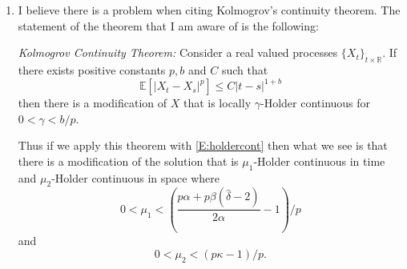 \documentclass[a4paper,11pt]{article}
\numberwithin{equation}{section}
\numberwithin{equation}{section}
\theoremstyle{plain}
\theoremstyle{definition}
\newcommand{\R}{\mathbb{R}}
\begin{document}
\begin{enumerate}
\begin{align*}
		\\& \quad \quad+ 2^{p-1}(4p)^{p/2} \left(\sup_{(s,y)\in[0,T]\times \R} \mathbb{E}\left[|u(s,y)|^p\right]\right)\left( C\left(|t_2-t_1|^{\frac{\alpha + \beta(\hat{\delta} -2)}{\alpha}}  \right)^{p/2} \right)
	\end{align*}
where 
	\[
			0 < \kappa < \frac{\alpha+\beta(\bar{\delta}-2)}{\beta}.
	\]
This does not reduce to statement of the Lemma. However, through repeated use of the inequality $(a+b)^p \le 2^{p-1}(a^p+b^p)$ we can say that 
	\begin{align}
		&2^{p-1}(4p)^{p/2} \left(\sup_{(s,y)\in[0,T]\times \R} \mathbb{E}\left[|u(s,y)|^p\right]\right) \left( C\left(|t_2-t_1|^{\frac{\alpha + \beta(\hat{\delta} -2)}{\alpha}} + |x_2-x_1|^{2\kappa} \right)\right)^{p/2} \nonumber
	\\ & \quad \quad+ 2^{p-1}(4p)^{p/2} \left(\sup_{(s,y)\in[0,T]\times \R} \mathbb{E}\left[|u(s,y)|^p\right]\right)\left( C\left(|t_2-t_1|^{\frac{\alpha + \beta(\hat{\delta} -2)}{\alpha}}  \right)^{p/2} \right) \nonumber
	\\ & \le 2^{(3p-4)/2}(4p)^{p/2} C\left(\sup_{(s,y)\in[0,T]\times \R} \mathbb{E}\left[|u(s,y)|^p\right]\right) \left(|t_2-t_1|^{\frac{p\alpha + p\beta(\hat{\delta} -2)}{2\alpha}} + |x_2-x_1|^{p\kappa} \right) \label{E:holdercont}
	\end{align}
and this inequality is essentially just as good as the one stated in the statement of Lemma 4. 

\item I believe there is a problem when citing Kolmogrov's continuity theorem. The statement of the theorem that I am aware of is the following: 

\textit{Kolmogrov Continuity Theorem:} Consider a real valued processes $\{X_t\}_{t \times \R}$. If there exists positive constants $p, b$ and $C$ such that 
		\[
			\mathbb{E}\left[ |X_t-X_s|^p \right] \le C |t-s|^{1+b}
		\]
then there is a modification of $X$ that is locally $\gamma$-Holder continuous for $0<\gamma < b/p$. 

Thus if we apply this theorem with \eqref{E:holdercont} then what we see is that there is a modification of the solution that is $\mu_1$-Holder continuous in time and $\mu_2$-Holder continuous in space where 
	\[
		0 < \mu_1 <\left( \frac{p\alpha + p\beta(\hat{\delta} -2)}{2\alpha} - 1 \right)/p
	\]
and 
	\[
		0 < \mu_2 < (p\kappa -1)/p.
	\]
\end{enumerate}
\end{document}
